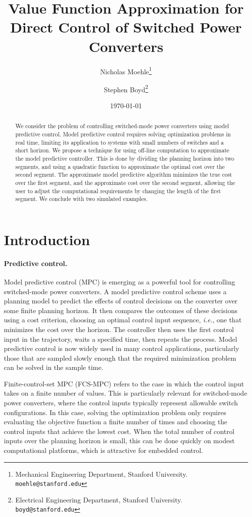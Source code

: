 \documentclass[12pt]{article}
\title{Value Function Approximation for Direct Control of Switched Power Converters}
\author{
Nicholas Moehle\thanks{
Mechanical Engineering Department, Stanford University. 
\texttt{moehle@stanford.edu}}
\and Stephen Boyd\thanks{
Electrical Engineering Department, Stanford University. 
\texttt{boyd@stanford.edu}}
}
\date{\today}
\newcommand{\ie}{{\it i.e.}}
\begin{document}
\maketitle

\begin{abstract}
We consider the problem of controlling switched-mode power converters
using model predictive control.  Model predictive control 
requires solving optimization problems in real time,
limiting its application to systems with small numbers of switches and a short horizon.  
We propose a technique for using off-line computation
to approximate the model predictive controller.
This is done by dividing the planning horizon into two segments,
and using a quadratic function to approximate the optimal cost over the second segment.
The approximate model predictive algorithm minimizes the true cost over the first segment,
and the approximate cost over the second segment,
allowing the user to adjust the computational requirements by changing the length
of the first segment.
We conclude with two simulated examples.
\end{abstract}



\section{Introduction}

\paragraph{Predictive control.}
Model predictive control (MPC) is emerging as a powerful tool for
controlling switched-mode power converters.
A model predictive control scheme uses a planning model
to predict the effects of control decisions
on the converter over some finite planning horizon.
It then compares the outcomes of these decisions using a cost criterion,
choosing an optimal control input sequence, \ie, one
that minimizes the cost over the horizon.
The controller then uses the first control input in the trajectory,
waits a specified time, then repeats the process.
Model predictive control is now widely used in many control applications,
particularly those that are sampled slowly enough that the required
minimization problem can be solved in the sample time.

Finite-control-set MPC (FCS-MPC)
refers to the case in which
the control input takes on a finite number of values.
This is particularly relevant for switched-mode power converters,
where the control inputs typically represent allowable switch configurations.
In this case, solving the optimization problem only requires evaluating
the objective function a finite number of times
and choosing the control inputs that achieve the lowest cost.
When the total number of control inputs over the planning horizon
is small,
this can be done quickly on modest computational platforms,
which is attractive for embedded control.
\end{document}
